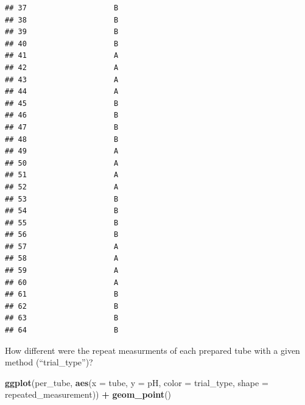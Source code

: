 \documentclass[
]{article}
\newenvironment{Shaded}{\begin{snugshade}}{\end{snugshade}}
\newcommand{\AttributeTok}[1]{\textcolor[rgb]{0.13,0.29,0.53}{#1}}
\newcommand{\FunctionTok}[1]{\textcolor[rgb]{0.13,0.29,0.53}{\textbf{#1}}}
\newcommand{\NormalTok}[1]{#1}
\newcommand{\SpecialCharTok}[1]{\textcolor[rgb]{0.81,0.36,0.00}{\textbf{#1}}}
\begin{document}
\begin{verbatim}
## 37                    B                                                      
## 38                    B                                                      
## 39                    B                                                      
## 40                    B                                                      
## 41                    A                                                      
## 42                    A                                                      
## 43                    A                                                      
## 44                    A                                                      
## 45                    B                                                      
## 46                    B                                                      
## 47                    B                                                      
## 48                    B                                                      
## 49                    A                                                      
## 50                    A                                                      
## 51                    A                                                      
## 52                    A                                                      
## 53                    B                                                      
## 54                    B                                                      
## 55                    B                                                      
## 56                    B                                                      
## 57                    A                                                      
## 58                    A                                                      
## 59                    A                                                      
## 60                    A                                                      
## 61                    B                                                      
## 62                    B                                                      
## 63                    B                                                      
## 64                    B
\end{verbatim}

How different were the repeat measurments of each prepared tube with a
given method (``trial\_type'')?

\begin{Shaded}
\begin{Highlighting}[]
\FunctionTok{ggplot}\NormalTok{(per\_tube, }\FunctionTok{aes}\NormalTok{(}\AttributeTok{x =}\NormalTok{ tube, }\AttributeTok{y =}\NormalTok{ pH, }\AttributeTok{color =}\NormalTok{ trial\_type, }\AttributeTok{shape =}\NormalTok{ repeated\_measurement)) }\SpecialCharTok{+}
  \FunctionTok{geom\_point}\NormalTok{()}
\end{Highlighting}
\end{Shaded}
\end{document}
